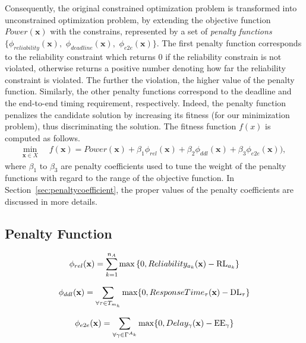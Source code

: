 Consequently, the original constrained optimization problem is transformed into unconstrained optimization problem, by extending the objective function $Power(\textbf{x})$ with the constrains, represented by a set of \textit{penalty functions} $\{\phi_{reliability}(\textbf{x}),$  $\phi_{deadline}(\textbf{x}),$ $\phi_{e2e}(\textbf{x})\}$. The first penalty function corresponds to the reliability constraint which returns 0 if the reliability constrain is not violated, otherwise returns a positive number denoting how far the reliability constraint is violated. The further the violation, the higher value of the penalty function. Similarly, the other penalty functions correspond to the deadline and the end-to-end timing requirement, respectively. 
Indeed, the penalty function penalizes the candidate solution by increasing its fitness (for our minimization problem), thus discriminating the solution. %
The fitness function $f(x)$ is computed as follows.
\begin{align}
\label{eqn_penalityfunc}
\min_{\textbf{x}\in X}\;\;& f(\textbf{x})=Power(\textbf{x}) + \beta_1 \phi_{rel}(\textbf{x}) + \beta_2 \phi_{ddl}(\textbf{x}) + \beta_3 \phi_{e2e}(\textbf{x})),
\end{align}
where $\beta_1$ to $\beta_3$ are penalty coefficients used to tune the weight of the penalty functions with regard to the range of the objective function. In Section~\ref{sec:penaltycoefficient}, the proper values of the penalty coefficients are discussed in more details.

\subsection{Penalty Function}
\label{sec:penaltyfunction}

\begin{equation}
\label{}
    \phi_{rel}(\textbf{x}) = \sum_{k=1}^{n_{A}}{\max {\{0, Reliability_{a_k}(\textbf{x}) - \mathrm{RL}_{a_k} \}}}
\end{equation}

\begin{equation}
\label{}
    \phi_{ddl}(\textbf{x}) = \sum_{\forall \tau\in T_{m_h}}{\max \{0, ResponseTime_{\tau}(\textbf{x}) - \mathrm{DL}_{\tau} \}}
\end{equation}

\begin{equation}
\label{}
    \phi_{e2e}(\textbf{x}) = \sum_{\forall \gamma \in \ssp{\Gamma}}{\max \{0, Delay_\gamma(\x) - \mathrm{EE}_\gamma \}}
\end{equation}

